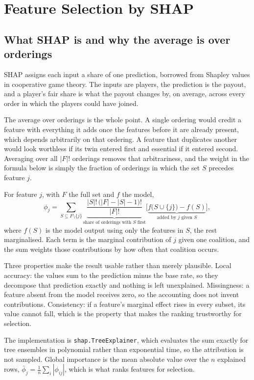 \documentclass[10pt,openany]{report}
\begin{document}
\section{Feature Selection by SHAP}
\label{sec:shapselect}

\subsection{What SHAP is and why the average is over orderings}

SHAP assigns each input a share of one prediction, borrowed from Shapley values in cooperative game
theory. The inputs are players, the prediction is the payout, and a player's fair share is what the
payout changes by, on average, across every order in which the players could have joined.

The average over orderings is the whole point. A single ordering would credit a feature with
everything it adds once the features before it are already present, which depends arbitrarily on that
ordering. A feature that duplicates another would look worthless if its twin entered first and
essential if it entered second. Averaging over all $|F|!$ orderings removes that arbitrariness, and
the weight in the formula below is simply the fraction of orderings in which the set $S$ precedes
feature $j$.

For feature $j$, with $F$ the full set and $f$ the model,
\[
\phi_j = \sum_{S \subseteq F \setminus \{j\}}
\underbrace{\frac{|S|!\,\big(|F|-|S|-1\big)!}{|F|!}}_{\text{share of orderings with }S\text{ first}}
\Big[ \underbrace{f\big(S \cup \{j\}\big) - f(S)}_{\text{added by }j\text{ given }S} \Big],
\]
where $f(S)$ is the model output using only the features in $S$, the rest marginalised. Each term is
the marginal contribution of $j$ given one coalition, and the sum weights those contributions by how
often that coalition occurs.

Three properties make the result usable rather than merely plausible. Local accuracy: the values sum
to the prediction minus the base rate, so they decompose that prediction exactly and nothing is left
unexplained. Missingness: a feature absent from the model receives zero, so the accounting does not
invent contributions. Consistency: if a feature's marginal effect rises in every subset, its value
cannot fall, which is the property that makes the ranking trustworthy for selection.

The implementation is \texttt{shap.TreeExplainer}, which evaluates the sum exactly for tree ensembles
in polynomial rather than exponential time, so the attribution is not sampled. Global importance is
the mean absolute value over the $n$ explained rows,
$\bar{\phi}_j = \frac{1}{n}\sum_i |\phi_{ij}|$, which is what ranks features for selection.
\end{document}
